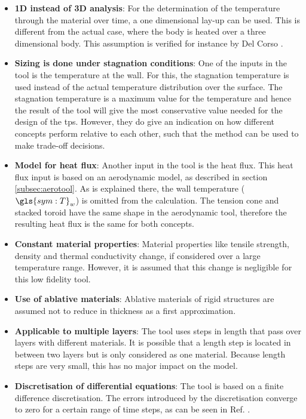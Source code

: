 \begin{itemize}
\item \textbf{1D instead of 3D analysis}: For the determination of the temperature through the material over time, a one dimensional lay-up can be used. This is different from the actual case, where the body is heated over a three dimensional body. This assumption is verified for instance by Del Corso \cite{Corso2009}.
\item \textbf{Sizing is done under stagnation conditions}: One of the inputs in the tool is the temperature at the wall. For this, the stagnation temperature is used instead of the actual temperature distribution over the surface. The stagnation temperature is a maximum value for the temperature and hence the result of the tool will give the most conservative value needed for the design of the \gls{tps}. However, they do give an indication on how different concepts perform relative to each other, such that the method can be used to make trade-off decisions.
\item \textbf{Model for heat flux}: Another input in the tool is the heat flux. This heat flux input is based on an aerodynamic model, as described in section \ref{subsec:aerotool}. As is explained there, the wall temperature ($\gls{sym:T}_w$) is omitted from the calculation. The tension cone and stacked toroid have the same shape in the aerodynamic tool, therefore the resulting heat flux is the same for both concepts.
\item \textbf{Constant material properties}: Material properties like tensile strength, density and thermal conductivity change, if considered over a large temperature range. However, it is assumed that this change is negligible for this low fidelity tool. 
\item \textbf{Use of ablative materials}: Ablative materials of rigid structures are assumed not to reduce in thickness as a first approximation.
\item \textbf{Applicable to multiple layers}: The tool uses steps in length that pass over layers with different materials. It is possible that a length step is located in between two layers but is only considered as one material. Because length steps are very small, this has no major impact on the model.
\item \textbf{Discretisation of differential equations}: The tool is based on a finite difference discretisation. The errors introduced by the discretisation converge to zero for a certain range of time steps, as can be seen in Ref. \cite{Smith2011,Holman2002}. 
\end{itemize}

